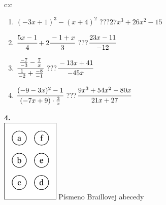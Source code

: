 \documentclass[10pt]{report}
\begin{document}
\begin{tabular}{c:c}
\begin{minipage}[c][104.5mm][t]{0.5\linewidth}
\begin{center}
\begin{minipage}{0.79\linewidth}
\begin{center}
\begin{varwidth}{\linewidth}
\begin{enumerate}
\item $(-3x+1)^3-(x+4)^2$\quad \dotfill\; ???\;\dotfill \quad $27x^3+26x^2-15$
\item $\cfrac{5x-1}{4}+2\cfrac{-1+x}{3}$\quad \dotfill\; ???\;\dotfill \quad $\cfrac{23x-11}{-12}$
\item $\cfrac{\frac{-7}{-3}-\frac{7}{x}}{\frac{1}{-2}+\frac{-8}{-1}}$\quad \dotfill\; ???\;\dotfill \quad $\cfrac{-13x+41}{-45x}$
\item $\cfrac{(-9-3x)^2-1}{(-7x+9)\cdot\frac{3}{x}}$\quad \dotfill\; ???\;\dotfill \quad $\cfrac{9x^3+54x^2-80x}{21x+27}$
\end{enumerate}
\end{varwidth}
\end{center}
\end{minipage}
\begin{minipage}{0.20\linewidth}
\begin{center}
{\Huge\bfseries 4.} \\[2mm]
\includegraphics[height=40mm]{../images/braille.png}
{\small Písmeno Braillovej abecedy}
\end{center}
\end{minipage}
\end{center}
\end{minipage}
%
\end{tabular}
\newpage
\thispagestyle{empty}
\end{document}
